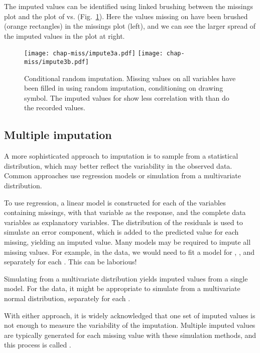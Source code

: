 The imputed values can be identified using linked brushing between the
missings plot and the plot of  vs.
 (Fig.~\ref{impute4}). Here the values missing on 
 have been brushed (orange rectangles) in the 
missings plot (left), and we can see the larger spread of the imputed
values in the plot at right. 

\begin{figure}[htbp]
\centerline{
  {\texttt{[image: chap-miss/impute3a.pdf]}}
  {\texttt{[image: chap-miss/impute3b.pdf]}} }
\caption[Conditional random imputation]{Conditional random
imputation.  Missing values on all variables have been filled in using
random imputation, conditioning on drawing symbol.  The imputed values
for  show less correlation with 
than do the recorded values.}
\label{impute4}
\end{figure}

\subsection{Multiple imputation}

A more sophisticated approach to imputation is to sample from a
statistical distribution, which may better reflect the variability in
the observed data. Common approaches use regression models or
simulation from a multivariate distribution.

To use regression, a linear model is constructed for each of the
variables containing missings, with that variable as the response, and
the complete data variables as explanatory variables. The distribution
of the residuals is used to simulate an error component, which is
added to the predicted value for each missing, yielding an imputed
value. Many models may be required to impute all missing
values. For example, in the  data, we would need to fit a
model for , , and
 separately for each .  This can be laborious!

Simulating from a multivariate distribution yields imputed values from
a single model. For the  data, it might be appropriate to
simulate from a multivariate normal distribution, separately for each
. 


With either approach, it is widely acknowledged that one set of
imputed values is not enough to measure the variability of the
imputation.  Multiple imputed values are typically generated for each
missing value with these simulation methods, and this process is
called .


